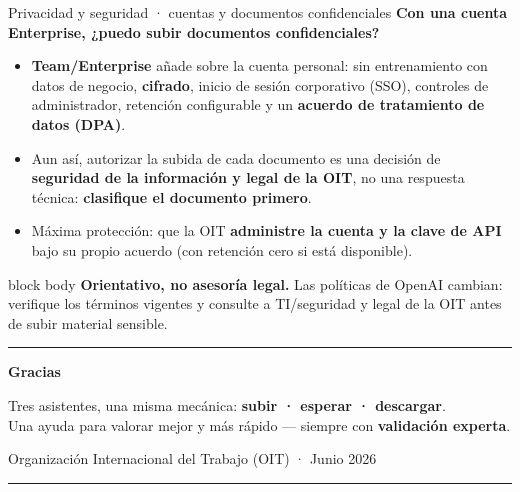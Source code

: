 \documentclass[aspectratio=169,11pt]{beamer}
\newcommand{\redlead}[1]{\textbf{\color{iloRed}#1}}
\newcommand{\bluelead}[1]{\textbf{\color{iloBlue}#1}}
\begin{document}
\begin{frame}{Privacidad y seguridad · cuentas y documentos confidenciales}
  \small
  \textbf{Con una cuenta Enterprise, ¿puedo subir documentos confidenciales?}
  \vspace{0.15cm}
  \begin{itemize}
    \item[\textcolor{iloRed}{\textbullet}] \textbf{Team/Enterprise} añade sobre la cuenta personal: sin entrenamiento con datos de negocio, \bluelead{cifrado}, inicio de sesión corporativo (SSO), controles de administrador, retención configurable y un \bluelead{acuerdo de tratamiento de datos (DPA)}.
    \item[\textcolor{iloRed}{\textbullet}] Aun así, autorizar la subida de cada documento es una decisión de \bluelead{seguridad de la información y legal de la OIT}, no una respuesta técnica: \textbf{clasifique el documento primero}.
    \item[\textcolor{iloRed}{\textbullet}] Máxima protección: que la OIT \bluelead{administre la cuenta y la clave de API} bajo su propio acuerdo (con retención cero si está disponible).
  \end{itemize}
  \vspace{0.15cm}\par
  \begin{beamercolorbox}[wd=\textwidth,sep=6pt]{block body}
    \footnotesize \redlead{Orientativo, no asesoría legal.} Las políticas de OpenAI cambian: verifique los términos vigentes y consulte a TI/seguridad y legal de la OIT antes de subir material sensible.
  \end{beamercolorbox}
\end{frame}

{
\begin{frame}[plain]
  \vspace{1.2cm}
  \begin{beamercolorbox}[wd=\paperwidth,ht=1.1ex,dp=0ex]{}\color{iloRed}\rule{\paperwidth}{2pt}\end{beamercolorbox}
  \vspace{0.9cm}
  {\color{iloBlue}\Large\bfseries Gracias\par}
  \vspace{0.4cm}
  {\color{iloGray}\small Tres asistentes, una misma mecánica: \bluelead{subir · esperar · descargar}.\\
  Una ayuda para valorar mejor y más rápido — siempre con \redlead{validación experta}.\par}
  \vspace{1.0cm}
  {\color{iloGray}\footnotesize Organización Internacional del Trabajo (OIT) · Junio 2026\par}
  \vspace{0.5cm}
  \begin{beamercolorbox}[wd=\paperwidth,ht=1.1ex,dp=0ex]{}\color{iloBlue}\rule{\paperwidth}{2pt}\end{beamercolorbox}
\end{frame}}
\end{document}
